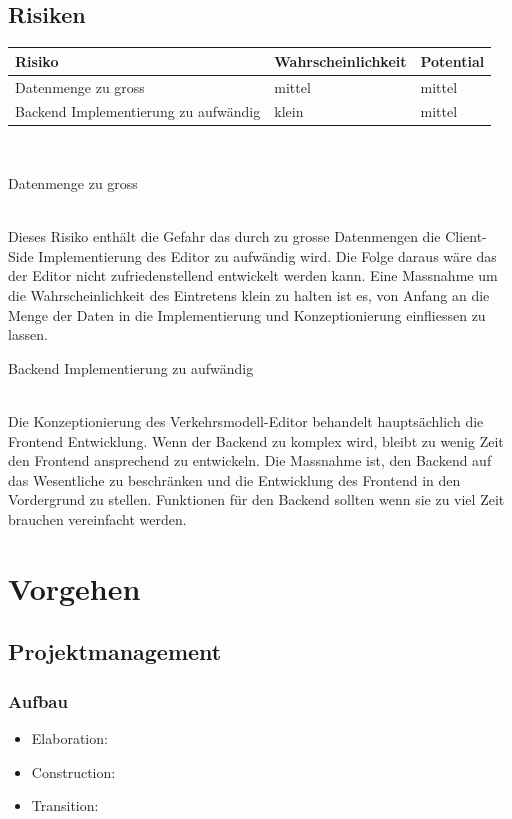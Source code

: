 \documentclass[10pt,a4paper]{article}
\begin{document}
\subsection{Risiken}
\begin{flushleft}
\begin{tabular}{l l l}
Risiko & Wahrscheinlichkeit & Potential\\
\hline
Datenmenge zu gross & mittel & mittel\\
Backend Implementierung zu aufwändig & klein & mittel\\
\end{tabular}\\[0.2cm]
\begin{large}Datenmenge zu gross\end{large}\\
Dieses Risiko enthält die Gefahr das durch zu grosse Datenmengen die Client-Side Implementierung des Editor zu aufwändig wird. Die Folge daraus wäre das der Editor nicht zufriedenstellend entwickelt werden kann. Eine Massnahme um die Wahrscheinlichkeit des Eintretens klein zu halten ist es, von Anfang an die Menge der Daten in die Implementierung und Konzeptionierung einfliessen zu lassen.\\[0.2cm]
\begin{large}Backend Implementierung zu aufwändig\end{large}\\
Die Konzeptionierung des Verkehrsmodell-Editor behandelt hauptsächlich die Frontend Entwicklung. Wenn der Backend zu komplex wird, bleibt zu wenig Zeit den Frontend ansprechend zu entwickeln. Die Massnahme ist, den Backend auf das Wesentliche zu beschränken und die Entwicklung des Frontend in den Vordergrund zu stellen. Funktionen für den Backend sollten wenn sie zu viel Zeit brauchen vereinfacht werden.\\

\end{flushleft}
\newpage
\section{Vorgehen}
\subsection{Projektmanagement}
\subsubsection{Aufbau}
\begin{itemize}
	\item Elaboration: 
	\item Construction: 
	\item Transition: 
\end{itemize}
\end{document}
